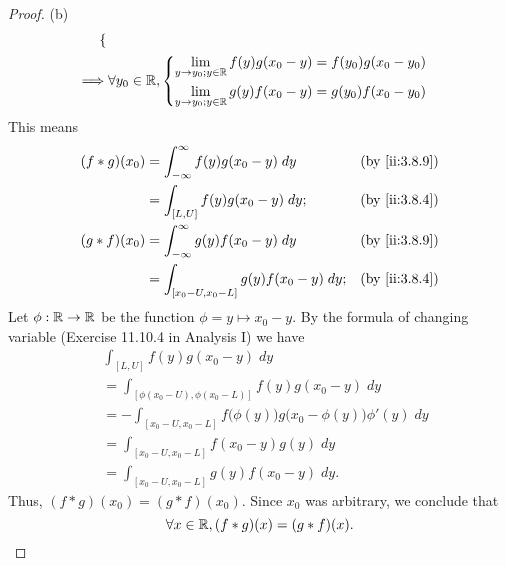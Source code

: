 \begin{proof}{(b)}
\begin{align*}
\begin{dcases}
                                   \end{dcases}             \\
    \implies & \forall y_0 \in \mathbb{R}, \begin{dcases}
                                     \lim_{y \to y_0 ; y \in \mathbb{R}} f(y) g(x_0 - y) = f(y_0) g(x_0 - y_0) \\
                                     \lim_{y \to y_0 ; y \in \mathbb{R}} g(y) f(x_0 - y) = g(y_0) f(x_0 - y_0)
                                   \end{dcases}
  \end{align*}
  This means
  \begin{align*}
    (f * g)(x_0) & = \int_{-\infty}^\infty f(y) g(x_0 - y) \; dy      &  & \by{ii:3.8.9} \\
                 & = \int_{[L, U]} f(y) g(x_0 - y) \; dy;             &  & \by{ii:3.8.4} \\
    (g * f)(x_0) & = \int_{-\infty}^\infty g(y) f(x_0 - y) \; dy      &  & \by{ii:3.8.9} \\
                 & = \int_{[x_0 - U, x_0 - L]} g(y) f(x_0 - y) \; dy; &  & \by{ii:3.8.4}
  \end{align*}
  Let \(\phi : \mathbb{R} \to \mathbb{R}\) be the function \(\phi = y \mapsto x_0 - y\).
  By the formula of changing variable (Exercise 11.10.4 in Analysis I) we have
  \begin{align*}
     & \int_{[L, U]} f(y) g(x_0 - y) \; dy                                                     \\
     & = \int_{[\phi(x_0 - U), \phi(x_0 - L)]} f(y) g(x_0 - y) \; dy                           \\
     & = -\int_{[x_0 - U, x_0 - L]} f\big(\phi(y)\big) g\big(x_0 - \phi(y)\big) \phi'(y) \; dy \\
     & = \int_{[x_0 - U, x_0 - L]} f(x_0 - y) g(y) \; dy                                       \\
     & = \int_{[x_0 - U, x_0 - L]} g(y) f(x_0 - y) \; dy.
  \end{align*}
  Thus, \((f * g)(x_0) = (g * f)(x_0)\).
  Since \(x_0\) was arbitrary, we conclude that
  \[
    \forall x \in \mathbb{R}, (f * g)(x) = (g * f)(x).
  \]
\end{proof}

